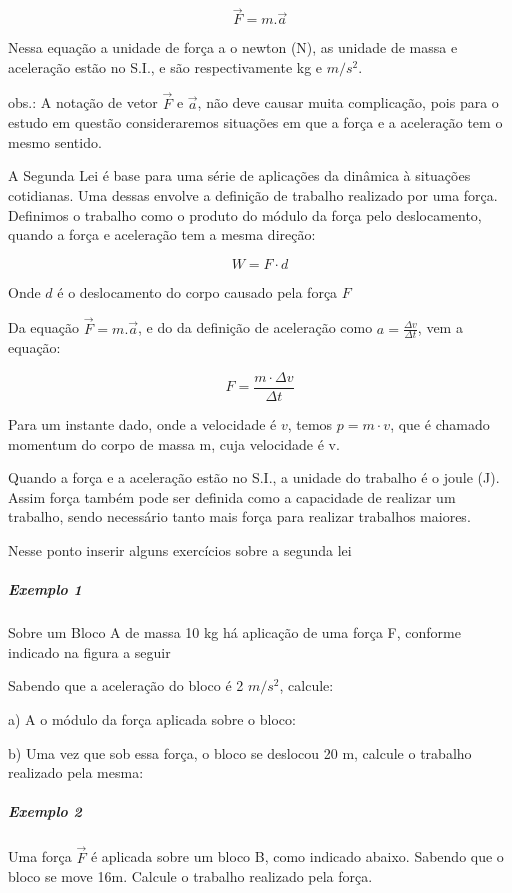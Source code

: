\documentclass[12pt,a4paper]{book}
\begin{document}
$$\vec{F}=m.\vec{a}$$

Nessa equação a unidade de força a o newton (N), as unidade de massa e aceleração estão no S.I., e são respectivamente kg e $m/s^{2}$.

obs.: A notação de vetor $\vec{F}$ e $\vec{a}$, não deve causar muita complicação, pois para o estudo em questão consideraremos situações em que a força e a aceleração tem o mesmo sentido. 

A Segunda Lei é base para uma série de aplicações da dinâmica à situações cotidianas. Uma dessas envolve a definição de trabalho realizado por uma força. Definimos o trabalho como o produto do módulo da força pelo deslocamento, quando a força e aceleração tem a mesma direção:

$$ W = F \cdot d$$

Onde $d$ é o deslocamento do corpo causado pela força $F$

Da equação $\vec{F}=m.\vec{a}$, e do da definição de aceleração como $ a = \frac{\Delta v}{\Delta t}$, vem a equação:

$$ F = \frac{m \cdot \Delta v}{\Delta t}$$

Para um instante dado, onde a velocidade é $v$, temos $p = m \cdot v$, que é chamado momentum do corpo de massa m, cuja velocidade é v.

Quando a força e a aceleração estão no S.I., a unidade do trabalho é o joule (J). Assim força também pode ser definida como a capacidade de realizar um trabalho, sendo necessário tanto mais força para realizar trabalhos maiores. 

{Nesse ponto inserir alguns exercícios sobre a segunda lei}

				\subparagraph{Exemplo 1} Sobre um Bloco A de massa 10 kg há aplicação de uma força F, conforme indicado na figura a seguir


Sabendo que a aceleração do bloco é 2 $m/s^2$, calcule:

a) A o módulo da força aplicada sobre o bloco:

b) Uma vez que sob essa força, o bloco se deslocou 20 m, calcule o trabalho realizado pela mesma:

				\subparagraph{Exemplo 2} Uma força $\vec{F}$ é aplicada sobre um bloco B, como indicado abaixo. Sabendo que o bloco se move 16m. Calcule o trabalho realizado pela força.
\end{document}
